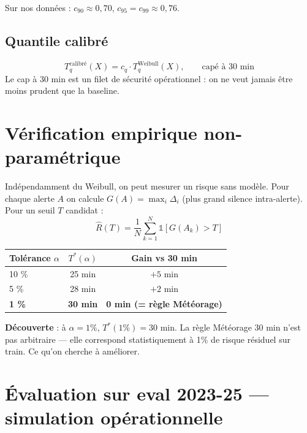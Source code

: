 \documentclass[11pt,a4paper]{article}
\begin{document}
Sur nos données : $c_{90} \approx 0{,}70$, $c_{95} = c_{99} \approx 0{,}76$.

\subsection{Quantile calibré}
\[
T_q^{\text{calibré}}(X) = c_q \cdot T_q^{\text{Weibull}}(X), \qquad \text{capé à 30 min}
\]
Le cap à 30 min est un filet de sécurité opérationnel : on ne veut jamais être moins
prudent que la baseline.

\section{Vérification empirique non-paramétrique}

Indépendamment du Weibull, on peut mesurer un risque sans modèle. Pour chaque alerte $A$
on calcule $G(A) = \max_i \Delta_i$ (plus grand silence intra-alerte). Pour un seuil $T$
candidat :
\[
\widehat{R}(T) = \frac{1}{N}\sum_{k=1}^{N} \mathbb{1}[G(A_k) > T]
\]

\begin{table}[H]
\centering
\begin{tabular}{lcc}
\toprule
\textbf{Tolérance $\alpha$} & \textbf{$T^*(\alpha)$} & \textbf{Gain vs 30 min} \\
\midrule
10 \% & 25 min & $+5$ min \\
 5 \% & 28 min & $+2$ min \\
\textbf{1 \%} & \textbf{30 min} & \textbf{0 min (= règle Météorage)} \\
\bottomrule
\end{tabular}
\end{table}

\begin{tcolorbox}[colback=blue!5,colframe=blue!50!black]
\textbf{Découverte} : à $\alpha = 1\%$, $T^*(1\%) = 30$ min. La règle Météorage 30 min n'est
pas arbitraire — elle correspond statistiquement à 1\% de risque résiduel sur train. Ce
qu'on cherche à améliorer.
\end{tcolorbox}

\section{Évaluation sur eval 2023-25 — simulation opérationnelle}
\label{sec:eval}
\end{document}

